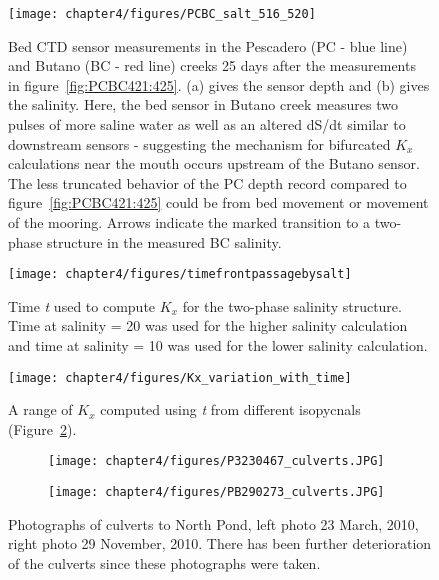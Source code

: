 \begin{figure}
	\texttt{[image: chapter4/figures/PCBC\_salt\_516\_520]}
	\caption{Bed CTD sensor measurements in the Pescadero (PC - blue line) and Butano (BC - red line) creeks 25 days after the measurements in figure~\ref{fig:PCBC421:425}. (a) gives the sensor depth and (b) gives the salinity. Here, the bed sensor in Butano creek measures two pulses of more saline water as well as an altered dS/dt similar to downstream sensors - suggesting the mechanism for bifurcated $K_x$ calculations near the mouth occurs upstream of the Butano sensor. The less truncated behavior of the PC depth record compared to figure~\ref{fig:PCBC421:425} could be from bed movement or movement of the mooring. Arrows indicate the marked transition to a two-phase structure in the measured BC salinity.}  \label{fig:PCBC511:516}
\end{figure}


\begin{figure}
\centering
	\texttt{[image: chapter4/figures/timefrontpassagebysalt]}
	\caption{Time \emph{t} used to compute $K_x$ for the two-phase salinity structure. Time at salinity = 20 was used for the higher salinity calculation and time at salinity = 10 was used for the lower salinity calculation.}  \label{fig:tvsS}
\end{figure}



\begin{figure}
\centering
	\texttt{[image: chapter4/figures/Kx\_variation\_with\_time]}
	\caption{A range of $K_x$ computed using \emph{t} from different isopycnals (Figure~\ref{fig:tvsS}).}  \label{fig:Kxvst}
\end{figure}



\begin{figure}
\centering
\begin{subfigure}{.48\textwidth}
	\texttt{[image: chapter4/figures/P3230467\_culverts.JPG]}
\end{subfigure}
\begin{subfigure}{.48\textwidth}
	\texttt{[image: chapter4/figures/PB290273\_culverts.JPG]}
\end{subfigure}
\caption{Photographs of culverts to North Pond, left photo 23 March, 2010, right photo 29 November, 2010. There has been further deterioration of the culverts since these photographs were taken.} \label{fig:photoCulverts}
\end{figure}




